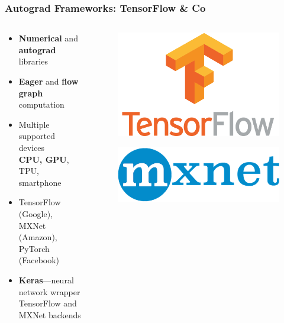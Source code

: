 \documentclass[aspectratio=169]{beamer}
\newcommand\imageright[1]{ %
    \caption*{\scalebox{.5}{\textcolor{lightgray}{\textcopyright~#1}}} %
}
\begin{document}
\begin{frame}
\frametitle{Autograd Frameworks: TensorFlow \& Co}

\begin{columns}
    \begin{column}{0.48\textwidth}
        \begin{itemize}
            \item \textbf{Numerical} and \textbf{autograd} libraries
            \item \textbf{Eager} and \textbf{flow graph} computation
            \item Multiple supported devices\\
            \textbf{CPU, GPU}, TPU, smartphone
            \item TensorFlow (Google), MXNet (Amazon), PyTorch (Facebook)
            \item \textbf{Keras}---neural network wrapper\\
            TensorFlow and MXNet backends
        \end{itemize}
    \end{column}
    \begin{column}{0.23\textwidth}
        \begin{figure}
            \centering
            \includegraphics[height=0.6\linewidth]{tensorflow.png}
            \imageright{Google}
        \end{figure}
        \vfill
        \begin{figure}
            \centering
            \includegraphics[width=0.9\linewidth]{mxnet.png}

\end{figure}
\end{column}
\end{columns}
\end{frame}
\end{document}
